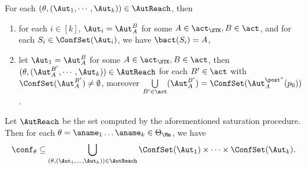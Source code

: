 \begin{proposition}\label{prop:sat0}
    For each $(\theta,(\Aut_1,\cdots,\Aut_k))\in\AutReach$, then 
    \begin{enumerate}
        \item for each $i\in[k]$, $\Aut_i = \Aut_A^B$ for some $A\in\act_{\STK},B\in\act$, and for each $S_i\in\ConfSet(\Aut_i)$, we have $\bact(S_i) = A$,
        \item let $\Aut_1 = \Aut_A^B$ for some $A\in\act_{\STK},B\in\act$, then $(\theta,(\Aut_A^{B'},\cdots,\Aut_k))\in\AutReach$ for each $B'\in\act$ with $\ConfSet(\Aut_A^{B'})\neq\emptyset$, moreover $\bigcup\limits_{B'\in\act}(\Aut_A^{B'}) = \ConfSet(\Aut_{A}^{\post^*}(p_0))$.
    \end{enumerate}
\end{proposition}

\smallskip
\begin{lemma}\label{lem:a0nostk}
    Let $\AutReach$ be the set computed by the aforementioned saturation procedure. Then for each $\theta=\aname_1\dots\aname_k\in\Theta_{\Mm}$, we have
    $$\conf_{\theta}\subseteq\bigcup \limits_{(\theta, (\Aut_1, \dots, \Aut_k)) \in \AutReach} \ConfSet(\Aut_1) \times \dots \times \ConfSet(\Aut_k).$$
\end{lemma}

